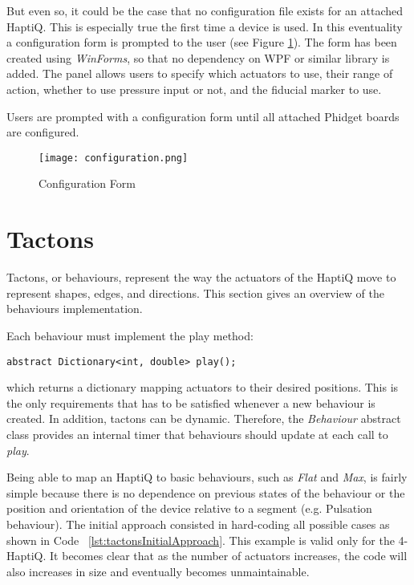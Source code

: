 But even so, it could be the case that no configuration file exists for an attached HaptiQ. This is especially true the first time a device is used. In this eventuality a configuration form is prompted to the user (see Figure \ref{fig:configurationPanel}). The form has been created using \textit{WinForms}, so that no dependency on WPF or similar library is added. The panel allows users to specify which actuators to use, their range of action, whether to use pressure input or not, and the fiducial marker to use. 

Users are prompted with a configuration form until all attached Phidget boards are configured.

\begin{figure}[H]
  \centering
  \texttt{[image: configuration.png]}
  \caption{Configuration Form}
  \label{fig:configurationPanel}
\end{figure}

\section{Tactons}

Tactons, or behaviours, represent the way the actuators of the HaptiQ move to represent shapes, edges, and directions. This section gives an overview of the behaviours implementation.

Each behaviour must implement the play method:

\lstset{style=sharpc1}
\begin{lstlisting}
abstract Dictionary<int, double> play();
\end{lstlisting}

which returns a dictionary mapping actuators to their desired positions. 
This is the only requirements that has to be satisfied whenever a new behaviour is created. In addition, tactons can be dynamic. Therefore, the \textit{Behaviour} abstract class provides an internal timer that behaviours should update at each call to \textit{play}. 

Being able to map an HaptiQ to basic behaviours, such as \textit{Flat} and \textit{Max}, is fairly simple because there is no dependence on previous states of the behaviour or the position and orientation of the device relative to a segment (e.g. Pulsation behaviour). The initial approach consisted in hard-coding all possible cases as shown in Code ~\ref{lst:tactonsInitialApproach}. This example is valid only for the 4-HaptiQ. It becomes clear that as the number of actuators increases, the code will also increases in size and eventually becomes unmaintainable. 


